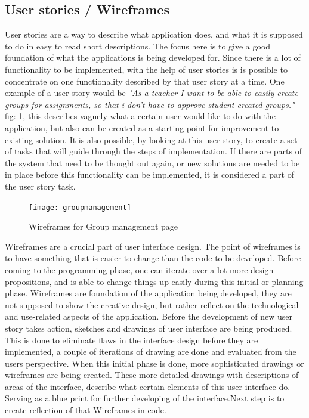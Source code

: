 \subsection{User stories / Wireframes}
User stories are a way to describe what application does, and what it is supposed to do in easy to read short descriptions. The focus here is to give a good foundation of what the applications is being developed for. Since there is a lot of functionality to be implemented, with the help of user stories is is possible to concentrate on one functionality described by that user story at a time. One example of a user story would be \emph{"As a teacher I want to be able to easily create groups for assignments, so that i don't have to approve student created groups."} fig: \ref{fig:groupmanagement}, this describes vaguely what a certain user would like to do with the application, but also can be created as a starting point for improvement to existing solution. It is also possible, by looking at this user story, to create a set of tasks that will guide through the steps of implementation. If there are parts of the system that need to be thought out again, or new solutions are needed to be in place before this functionality can be implemented, it is considered a part of the user story task.
\begin{figure}[h]
  \centering
  \texttt{[image: groupmanagement]}
  \caption{Wireframes for Group management page }
  \label{fig:groupmanagement}
\end{figure}
Wireframes are a crucial part of user interface design. The point of wireframes is to have something that is easier to change than the code to be developed. Before coming to the programming phase, one can iterate over a lot more design propositions, and is able to change things up easily during this initial or planning phase. Wireframes are foundation of the application being developed, they are not supposed to show the creative design, but rather reflect on the technological and use-related aspects of the application. Before the development of new user story takes action, sketches and drawings of user interface are being produced. This is done to eliminate flaws in the interface design before they are implemented, a couple of iterations of drawing are done and evaluated from the users perspective. When this initial phase is done, more sophisticated drawings or wireframes are being created. These more detailed drawings with descriptions of areas of the interface, describe what certain elements of this user interface do. Serving as a blue print for further developing of the interface.Next step is to create reflection of that Wireframes in code.


